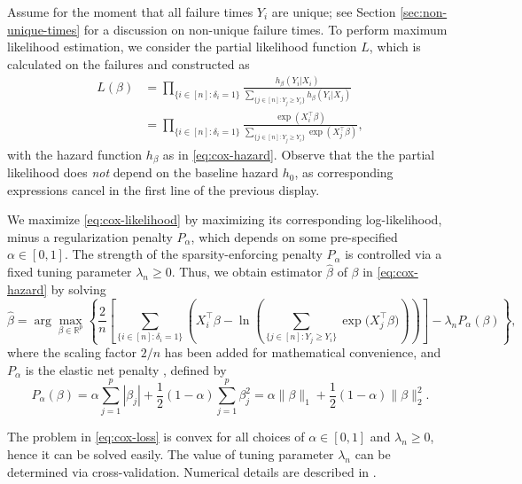 \documentclass[11pt]{article}
\newcommand{\R}{\mathbb{R}}
\begin{document}
Assume for the moment that all failure times $Y_i$ are unique; see Section \ref{sec:non-unique-times} for a discussion on non-unique failure times. To perform maximum likelihood estimation, we consider the partial likelihood function $L$, which is calculated on the failures and constructed as
\begin{equation} \label{eq:cox-likelihood}
    \begin{split}
        L(\beta)
        &=
        \prod_{\{ i \in [n] : \delta_i = 1 \}}
        \frac{ h_\beta(Y_i | X_i) }{ \sum_{\{ j\in[n] : Y_j \geq Y_i \}} h_\beta(Y_i | X_j) }
        \\
        &=
        \prod_{\{ i \in [n] : \delta_i = 1 \}}
        \frac{ \exp(X_i^\top \beta) }{ \sum_{\{ j\in[n] : Y_j \geq Y_i \}} \exp(X_j^\top \beta) },
    \end{split}
\end{equation}
with the hazard function $h_\beta$ as in \eqref{eq:cox-hazard}. Observe that the the partial likelihood does \textit{not} depend on the baseline hazard $h_0$, as corresponding expressions cancel in the first line of the previous display. 

We maximize \eqref{eq:cox-likelihood} by maximizing its corresponding log-likelihood, minus a regularization penalty $P_\alpha$, which depends on some pre-specified $\alpha \in [0,1]$. The strength of the sparsity-enforcing penalty $P_\alpha$ is controlled via a fixed tuning parameter $\lambda_n \geq 0$. Thus, we obtain estimator $\widehat{\beta}$ of $\beta$ in \eqref{eq:cox-hazard} by solving
\begin{equation} \label{eq:cox-loss}
    \widehat{\beta} 
    =
    \arg\max_{\beta \in \R^p}
    \left\{
        \frac{2}{n}
        \left[
            \sum_{\{i\in[n]:\delta_i = 1\}}
            \left(
            X_i^\top \beta
            -
            \ln
            \left(
            \sum_{\{ j\in[n] : Y_j \geq Y_i \}}
            \exp
            \big(
            X_j^\top \beta
            \big)
            \right)
            \right)
        \right]
        -
        \lambda_n
        P_\alpha (\beta)
    \right\},
\end{equation}
where the scaling factor $2/n$ has been added for mathematical convenience, and $P_\alpha$ is the elastic net penalty \citep{zou2005}, defined by
\[
    P_\alpha (\beta) = \alpha \sum_{j=1}^p |\beta_j| + \frac{1}{2} (1 - \alpha) \sum_{j=1}^p \beta_j^2
    =
    \alpha \|\beta \|_1 + \frac{1}{2} (1-\alpha) \|\beta \|_2^2.
\]

The problem in \eqref{eq:cox-loss} is convex for all choices of $\alpha \in [0,1]$ and $\lambda_n \geq 0$, hence it can be solved easily. The value of tuning parameter $\lambda_n$ can be determined via cross-validation. Numerical details are described in \cite{simon2011}.
\end{document}

